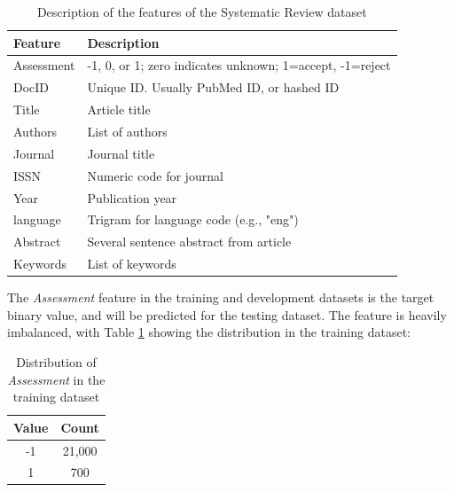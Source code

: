 \documentclass[11pt]{article}
\begin{document}
\begin{table}[!ht]
    \caption{Description of the features of the Systematic Review dataset}
    \begin{center}

        \begin{tabular}{| l | l |}
        \hline
        \textbf{Feature} & \textbf{Description}
        \\ \hline
        Assessment & -1, 0, or 1; zero indicates unknown; 1=accept, -1=reject
        \\ \hline
        DocID & Unique ID. Usually PubMed ID, or hashed ID
        \\ \hline
        Title & Article title
        \\ \hline
        Authors & List of authors
        \\ \hline
        Journal & Journal title
        \\ \hline
        ISSN & Numeric code for journal
        \\ \hline
        Year & Publication year
        \\ \hline
        language & Trigram for language code (e.g., "eng")
        \\ \hline
        Abstract & Several sentence abstract from article
        \\ \hline
        Keywords & List of keywords
        \\ \hline
        \end{tabular}

    \end{center}

\end{table}

The \textit{Assessment} feature in the training and development datasets is the target binary value, and will be predicted for the testing dataset. The feature is heavily imbalanced, with Table \ref{table:dist_train} showing the distribution in the training dataset:

\begin{table}[!ht]
    \caption{Distribution of \textit{Assessment} in the training dataset}
    \label{table:dist_train}
    \begin{center}

        \begin{tabular}{| c | c |}
        \hline
        \textbf{Value} & \textbf{Count}
        \\ \hline
        -1 & 21,000
        \\ \hline
        1 & 700
        \\ \hline
        \end{tabular}

    \end{center}

\end{table}
\end{document}
